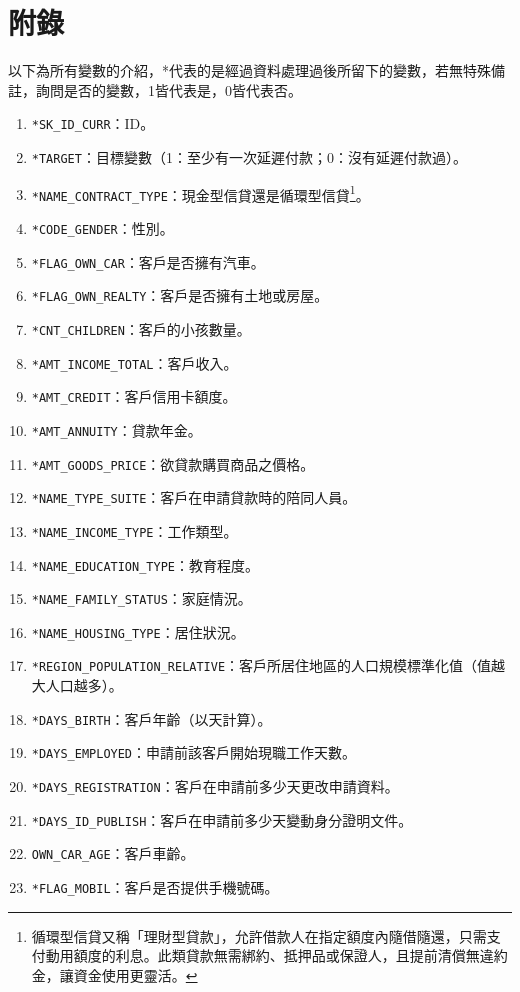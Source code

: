 \documentclass[12pt, a4paper]{article}
\begin{document}
\section{附錄}
以下為所有變數的介紹，*代表的是經過資料處理過後所留下的變數，若無特殊備註，詢問是否的變數，1皆代表是，0皆代表否。
\begin{enumerate}
\item \verb|*SK_ID_CURR|：ID。
\item \verb|*TARGET|：目標變數（1：至少有一次延遲付款；0：沒有延遲付款過）。
\item \verb|*NAME_CONTRACT_TYPE|：現金型信貸還是循環型信貸\footnote{循環型信貸又稱「理財型貸款」，允許借款人在指定額度內隨借隨還，只需支付動用額度的利息。此類貸款無需綁約、抵押品或保證人，且提前清償無違約金，讓資金使用更靈活。}。 
\item \verb|*CODE_GENDER|：性別。
\item \verb|*FLAG_OWN_CAR|：客戶是否擁有汽車。
\item \verb|*FLAG_OWN_REALTY|：客戶是否擁有土地或房屋。
\item \verb|*CNT_CHILDREN|：客戶的小孩數量。
\item \verb|*AMT_INCOME_TOTAL|：客戶收入。
\item \verb|*AMT_CREDIT|：客戶信用卡額度。
\item \verb|*AMT_ANNUITY|：貸款年金。
\item \verb|*AMT_GOODS_PRICE|：欲貸款購買商品之價格。
\item \verb|*NAME_TYPE_SUITE|：客戶在申請貸款時的陪同人員。
\item \verb|*NAME_INCOME_TYPE|：工作類型。
\item \verb|*NAME_EDUCATION_TYPE|：教育程度。
\item \verb|*NAME_FAMILY_STATUS|：家庭情況。
\item \verb|*NAME_HOUSING_TYPE|：居住狀況。
\item \verb|*REGION_POPULATION_RELATIVE|：客戶所居住地區的人口規模標準化值（值越大人口越多）。
\item \verb|*DAYS_BIRTH|：客戶年齡（以天計算）。
\item \verb|*DAYS_EMPLOYED|：申請前該客戶開始現職工作天數。
\item \verb|*DAYS_REGISTRATION|：客戶在申請前多少天更改申請資料。
\item \verb|*DAYS_ID_PUBLISH|：客戶在申請前多少天變動身分證明文件。
\item \verb|OWN_CAR_AGE|：客戶車齡。
\item \verb|*FLAG_MOBIL|：客戶是否提供手機號碼。

\end{enumerate}
\end{document}
